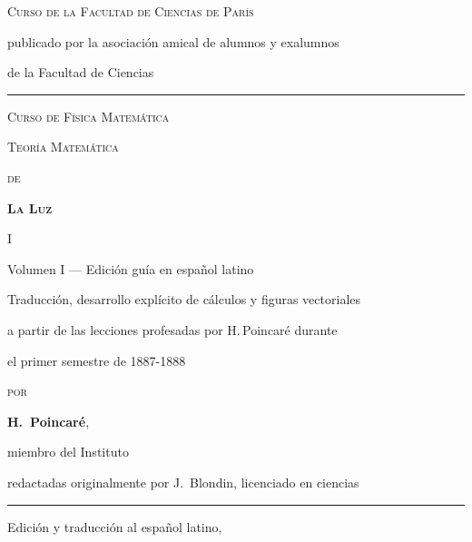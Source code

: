 \begin{titlepage}
\centering
\vspace*{1.5cm}

{\color{azulpoincare}\small\scshape Curso de la Facultad de Ciencias de París\par}
{\color{grisnota}\footnotesize publicado por la asociación amical de alumnos y exalumnos\par
de la Facultad de Ciencias\par}

\vspace{2pt}
\color{rojopoincare}\rule{0.55\textwidth}{0.6pt}
\color{black}
\vspace{18pt}

{\color{azulpoincare}\scshape\large Curso de Física Matemática\par}

\vspace{28pt}

{\color{azulpoincare}\scshape\Large Teoría Matemática\par}
{\color{azulpoincare}\scshape\large de\par}
{\color{azulpoincare}\bfseries\scshape\Huge La Luz\par}

\vspace{10pt}
{\color{rojopoincare}\large I\par}

\vspace{20pt}

{\small Volumen I — Edición guía en español latino\par}
{\footnotesize Traducción, desarrollo explícito de cálculos y figuras vectoriales\par
a partir de las lecciones profesadas por H.\,Poincaré durante\par
el primer semestre de 1887-1888\par}

\vspace{40pt}

{\scshape por\par}
\vspace{4pt}
{\Large\bfseries H.\ Poincaré}, {\small miembro del Instituto\par}

\vspace{6pt}
{\footnotesize redactadas originalmente por J.\ Blondin, licenciado en ciencias\par}

\vfill

\color{rojopoincare}\rule{0.35\textwidth}{0.6pt}\color{black}

\vspace{14pt}
{\footnotesize Edición y traducción al español latino, \the\year\par}

\end{titlepage}
